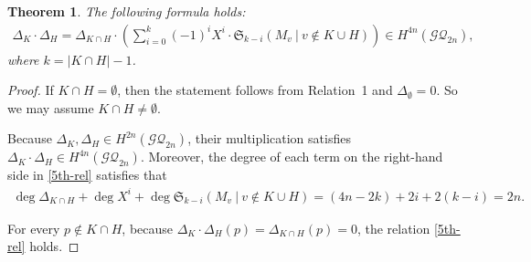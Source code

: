 \documentclass[12pt]{amsart}
\newtheorem{theorem}{Theorem}[section]
\theoremstyle{remark}
\numberwithin{equation}{section}
\begin{document}
\begin{theorem}
\label{rel5}
The following formula holds:
\begin{align}
\label{5th-rel}
\Delta_{K}\cdot \Delta_{H}=\Delta_{K\cap H}\cdot \left(\sum_{i=0}^{k}(-1)^{i}X^{i}\cdot \mathfrak{S}_{k-i}(M_{v}\ |\ v\not\in K\cup H) \right)\in H^{4n}(\mathcal{GQ}_{2n}),
\end{align}
where $k=|K\cap H|-1$. %
\end{theorem}
\begin{proof}
If $K\cap H=\emptyset$, then the statement follows from Relation~1 and $\Delta_{\emptyset}=0$.
So we may assume $K\cap H\not=\emptyset$.

Because $\Delta_{K}, \Delta_{H}\in H^{2n}(\mathcal{GQ}_{2n})$, their multiplication satisfies $\Delta_{K}\cdot \Delta_{H}\in H^{4n}(\mathcal{GQ}_{2n})$.
Moreover, the degree of each term on the right-hand side in \eqref{5th-rel} satisfies that
\begin{align*}
\deg \Delta_{K\cap H}+
\deg X^{i}+\deg \mathfrak{S}_{k-i}(M_{v}\ |\ v\not\in K\cup H) 
=(4n-2k)+2i+2(k-i)=2n.
\end{align*}
 
For every $p\not\in K\cap H$, because $\Delta_{K}\cdot \Delta_{H}(p)=\Delta_{K\cap H}(p)=0$, the relation \eqref{5th-rel} holds. 
 

\end{proof}
\end{document}
